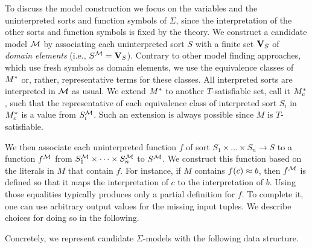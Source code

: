 \documentclass{svjour3}                     %
\begin{document}
To discuss the model construction we focus
on the variables and the uninterpreted sorts and function symbols of $\Sigma$,
since the interpretation of the other sorts and function symbols is fixed by the theory.
We construct a candidate model $\mathcal{M}$ by associating each uninterpreted sort $S$
with a finite set $\mathbf{V}_S$ of \emph{domain elements} (i.e., $S^{\mathcal{M}} = \mathbf{V}_S$).
Contrary to other model finding approaches, which use fresh symbols as domain elements,
we use the equivalence classes of $M^*$ or, rather,
representative terms for these classes.
All interpreted sorts are interpreted in $\mathcal{M}$ as usual.
We extend $M^*$ to another $T$-satisfiable set, call it $M^{*}_{c}$,
such that the representative of each equivalence class 
of interpreted sort $S_i$ in $M^{*}_{c}$ is a value from $S_i^{\mathcal{M}}$.
Such an extension is always possible since $M$ is $T$-satisfiable.

We then associate each uninterpreted function $f$ of sort 
$S_1 \times \ldots \times S_n \rightarrow S$
to a function $f^{\mathcal{M}}$ from $S_1^{\mathcal{M}} \times \cdots \times S_n^{\mathcal{M}}$ to $S^{\mathcal{M}}$.
We construct this function based on the literals in $M$ that contain $f$.
For instance, if $M$ contains $f( c ) \approx b$, then $f^{\mathcal{M}}$ is defined so that 
it maps the interpretation of $c$ to the interpretation of $b$.
Using those equalities typically produces only a partial definition for $f$.
To complete it, one can use arbitrary output values for the missing input tuples.
We describe choices for doing so in the following.

Concretely, we represent candidate $\Sigma$-models with the following data structure.
\end{document}
